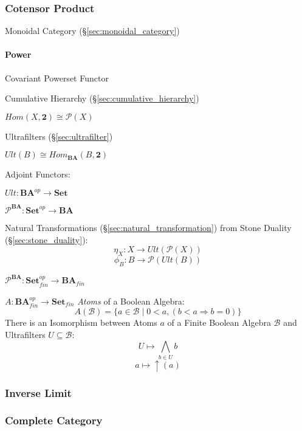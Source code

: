 \subsubsection{Cotensor Product}\label{sec:cotensor_product}

Monoidal Category (\S\ref{sec:monoidal_category})



\paragraph{Power}\label{sec:power}

Covariant Powerset Functor %

Cumulative Hierarchy (\S\ref{sec:cumulative_hierarchy})

$Hom(X,\mathbf{2}) \cong \mathcal{P}(X)$

Ultrafilters (\S\ref{sec:ultrafilter})

$Ult(B) \cong Hom_\mathbf{BA}(B,\mathbf{2})$

Adjoint Functors:

$Ult : \mathbf{BA}^{op} \rightarrow \mathbf{Set}$

$\mathcal{P}^\mathbf{BA} : \mathbf{Set}^{op} \rightarrow \mathbf{BA}$

Natural Transformations (\S\ref{sec:natural_transformation}) from
Stone Duality (\S\ref{sec:stone_duality}):
\[
  \eta_X : X \rightarrow Ult(\mathcal{P}(X))
\]\[
  \phi_B : B \rightarrow \mathcal{P}(Ult(B))
\]

$\mathcal{P}^\mathbf{BA} :
  \mathbf{Set}^{op}_{fin} \rightarrow \mathbf{BA}_{fin}$

$A : \mathbf{BA}^{op}_{fin} \rightarrow \mathbf{Set}_{fin}$
\emph{Atoms} of a Boolean Algebra:
\[
  A(\mathcal{B}) = \{ a \in \mathcal{B} \;|\;
    0 < a, (b < a \Rightarrow b = 0) \}
\]
There is an Isomorphism between Atoms $a$ of a Finite Boolean Algebra
$\mathcal{B}$ and Ultrafilters $U \subseteq \mathcal{B}$:
\[
  U \mapsto \bigwedge_{b \in U} b
\]\[
  a \mapsto \uparrow (a)
\]



\subsubsection{Inverse Limit}\label{sec:inverse_limit}

\subsubsection{Complete Category}\label{sec:complete_category}

